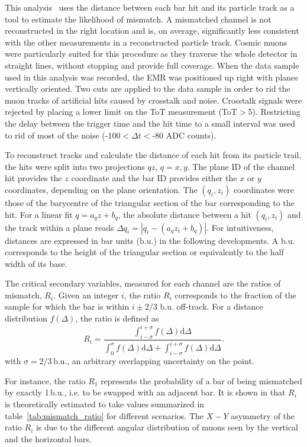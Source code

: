 \documentclass[a4paper,11pt]{article}
\begin{document}
This analysis~\cite{emr_xt, Francois} 
uses the distance between each bar hit and its particle track as a tool to estimate the likelihood of mismatch. A mismatched channel is
not reconstructed in the right location and is, on average, significantly less consistent with the other measurements in a reconstructed particle track.
Cosmic muons were particularly suited for this procedure as they traverse the whole detector in straight lines, without stopping and provide full coverage.
When the data sample used in this analysis was recorded, the EMR was positioned up right with planes vertically oriented. Two cuts are applied to the data
sample in order to rid the muon tracks of artificial hits caused by crosstalk and noise. Crosstalk signals were rejected by placing a lower limit on the
ToT measurement (ToT$>$5). Restricting the delay between the trigger time and the hit time to a small interval was used to rid of most of the noise
(-100$<\Delta t<$-80 ADC counts). 

To reconstruct tracks and calculate the distance of each hit from its particle trail, the hits were
split into two projections $qz$, $q=x,y$. The plane ID of the channel hit provides the $z$ coordinate and the bar ID provides either the $x$ or $y$ coordinates,
depending on the plane orientation. The $(q_i,z_i)$ coordinates were those of the barycentre of the triangular section of the bar corresponding to the hit. For
a linear fit $q=a_qz+b_q$, the absolute distance between a hit $(q_i,z_i)$ and the track within a plane reads $\Delta q_i=|q_i-(a_qz_i+b_q)|$. For intuitiveness,
distances are expressed in bar units ($\mathrm{b.u.}$) in the following developments. A $\mathrm{b.u.}$ corresponds to the height of the triangular section or
equivalently to the half width of its base.

The critical secondary variables, measured for each channel are the ratios of mismatch, $R_i$. Given an integer $i$, the ratio $R_i$ corresponds to the fraction
of the sample for which the bar is within $i\pm2/3$ $\mathrm{b.u.}$ off-track. For a distance distribution $f(\Delta)$, the ratio is defined as
\begin{equation}
R_i=\frac{\int_{i-\sigma}^{i+\sigma}f(\Delta)\mathrm{d}\Delta}{\int_{0}^{\sigma}f(\Delta)\mathrm{d}\Delta+\int_{i-\sigma}^{i+\sigma}f(\Delta)\mathrm{d}\Delta}.
\end{equation}
with $\sigma=2/3\,\mathrm{b.u.}$, an arbitrary overlapping uncertainty on the point.

For instance, the ratio $R_1$ represents the probability of a bar of being mismatched by exactly 1\,$\mathrm{b.u.}$, i.e. to be swapped with an adjacent bar.
It is shown in \cite{Francois} that $R_i$ is theoretically estimated to take values summarized in table~\ref{tab:mismatch_ratio} for different scenarios.
The $X-Y$ asymmetry of the ratio $R_i$ is due to the different angular distribution of muons seen by the vertical and the horizontal bars.
\end{document}
